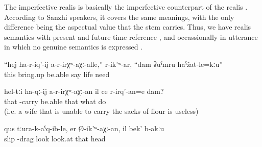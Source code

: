 The imperfective realis  is basically the imperfective counterpart of the realis . According to Sanzhi speakers, it covers the same meanings, with the only difference being the aspectual value that the stem carries. Thus, we have realis  semantics with present and future time reference ,  and occassionally in utterance in which no genuine  semantics is expressed . 
%
\begin{exe}
	\ex	\label{ex:If I cannot educate (up bring) her (myself), she said, then the life is of no need for me.}
	\gll	``hej	ha-r-iq'-ij	a-r-irχʷ-aχː-alle,''	r-ik'ʷ-ar,	``dam	ʡuˁmru	ħaˁžat-le=kːu''\\
		this	bring.up	be.able	say			life	need\\
	\glt	{}

	\ex	\label{ex:‎‎‎If she is not able to carry those (sacks), of what use is she for me?}
	\gll	hel-tːi	ha-qː-ij	a-r-irχʷ-aχː-an		il	ce	r-irq'-an=e	dam?\\
		that	-carry	be.able	that	what	do	\\
	\glt	{} (i.e. a wife that is unable to carry the sacks of flour is useless)

	\ex	\label{ex:After having pulled (him) out, if they look, there is not head}
	\gll	qus	tːura-k-aˁq-ib-le,	er	Ø-ik'ʷ-aχː-an,	il	bek'	b-akːu	\\
		slip	-drag	look	look.at	that		head	\\
	\glt	{}
\end{exe}

